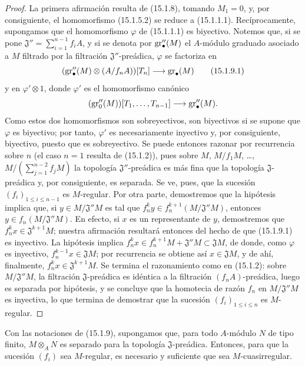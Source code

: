 \begin{proof}
La primera afirmación resulta de (15.1.8), tomando $M_1=0$, y, por
consiguiente, el homomorfismo (15.1.5.2) se reduce a (15.1.1.1).
Recíprocamente, supongamos que el homomorfismo $\varphi$ de (15.1.1.1) es
biyectivo. Notemos que, si se pone
$\mathfrak{J}''=\sum_{i=1}^{n-1}f_iA$,
y si se denota por $\operatorname{gr}''_\bullet(M)$ el $A$-módulo graduado asociado a $M$
filtrado por la filtración $\mathfrak{J}''$-preádica, $\varphi$ se factoriza en
\[
  (\operatorname{gr}''_\bullet(M)\otimes(A/f_nA))[T_n]\longrightarrow\operatorname{gr}_\bullet(M)
  \tag{15.1.9.1}\label{0.15.1.9.1-fr}
\]
y en $\varphi'\otimes1$, donde $\varphi'$ es el homomorfismo canónico
\[
  (\operatorname{gr}''_0(M))[T_1,\ldots,T_{n-1}]
  \longrightarrow\operatorname{gr}''_\bullet(M).
\]
Como estos dos homomorfismos son sobreyectivos, son biyectivos si se supone que
$\varphi$ es biyectivo; por tanto, $\varphi'$ es necesariamente inyectivo y,
por consiguiente, biyectivo, puesto que es sobreyectivo. Se puede entonces
razonar por recurrencia sobre $n$ (el caso $n=1$ resulta de (15.1.2)), pues
sobre
$M$, $M/f_1M$, \ldots, $M/(\sum_{j=1}^{n-2}f_jM)$
la topología $\mathfrak{J}''$-preádica es más fina que la topología
$\mathfrak{J}$-preádica y, por consiguiente, es separada. Se ve, pues, que la
sucesión $(f_i)_{1\leq i\leq n-1}$ es $M$-regular. Por otra parte, demostremos
que la hipótesis implica que, si $y\in M/\mathfrak{J}''M$ es tal que
$f_n^ky\in f_n^{k+1}(M/\mathfrak{J}''M)$,
entonces $y\in f_n(M/\mathfrak{J}''M)$. En efecto, si $x$ es un representante
de $y$, demostremos que $f_n^kx\in\mathfrak{J}^{k+1}M$; nuestra afirmación
resultará entonces del hecho de que (15.1.9.1) es inyectivo. La hipótesis
implica
$f_n^kx\in f_n^{k+1}M+\mathfrak{J}''M\subset\mathfrak{J}M$,
de donde, como $\varphi$ es inyectivo,
$f_n^{k-1}x\in\mathfrak{J}M$; por recurrencia se obtiene así
$x\in\mathfrak{J}M$, y de ahí, finalmente,
$f_n^kx\in\mathfrak{J}^{k+1}M$. Se termina el razonamiento como en
(15.1.2): sobre $M/\mathfrak{J}''M$, la filtración
$\mathfrak{J}$-preádica es idéntica a la filtración
$(f_nA)$-preádica, luego es separada por hipótesis, y se concluye que la
homotecia de razón $f_n$ en $M/\mathfrak{J}''M$ es inyectiva, lo que termina
de demostrar que la sucesión $(f_i)_{1\leq i\leq n}$ es $M$-regular.
\end{proof}

\begin{corollary}[15.1.10]
\label{0.15.1.10-fr}
Con las notaciones de \textup{(15.1.9)}, supongamos que, para todo $A$-módulo $N$ de
tipo finito, $M\otimes_A N$ es separado para la topología
$\mathfrak{J}$-preádica. Entonces, para que la sucesión $(f_i)$ sea
$M$-regular, es necesario y suficiente que sea $M$-cuasirregular.
\end{corollary}

